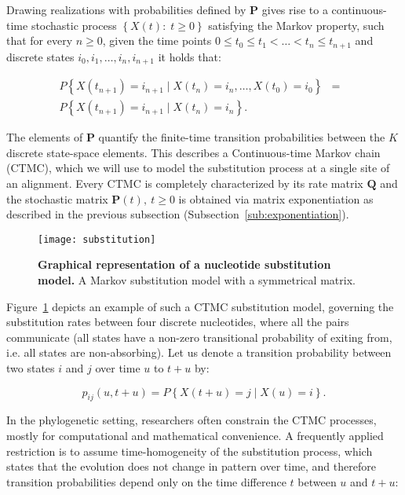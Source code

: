 Drawing realizations with probabilities defined by $\mathbf{P}$  gives rise to a continuous-time stochastic process $\left\{ X(t):\; t\geq0\right\}$ satisfying the Markov property, such that for every $n\geq 0$, given the time points $0\leq t_{0}\leq t_{1}<\ldots<t_{n}\leq t_{n+1}$ and discrete states $i_{0},i_{1}, \ldots, i_{n},i_{n+1}$ it holds that: 

\begin{eqnarray}
P\left\{ X(t_{n+1})=i_{n+1}\mid X(t_{n})=i_{n},\ldots, X(t_{0})=i_{0}\right\} & = & \\ \nonumber
P\left\{ X(t_{n+1})=i_{n+1}\mid X(t_{n})=i_{n}\right\} .
\label{eq:markov}
\end{eqnarray}

The elements of $\mathbf{P}$ quantify the finite-time transition probabilities between the $K$ discrete state-space elements.
This describes a Continuous-time Markov chain (CTMC), which  we will use to model the substitution process at a single site of an alignment.
Every CTMC is completely characterized by its rate matrix $\mathbf{Q}$ and the stochastic matrix $\mathbf{P}(t),\ t\geq0$ is obtained via matrix exponentiation as described in the previous subsection (Subsection~\ref{sub:exponentiation}).

\begin{figure}[H]
\centering
\texttt{[image: substitution]} 
\caption{
{ \footnotesize 
{\bf  Graphical representation of  a nucleotide substitution model.} A Markov substitution model with a symmetrical matrix.
} %
}
\label{fig:substitution}
\end{figure}

Figure~\ref{fig:substitution} depicts an example of such a CTMC substitution model, governing the substitution rates between four discrete nucleotides, where all the pairs communicate (all states have a non-zero transitional probability of exiting from, i.e. all states are non-absorbing).
Let us denote a transition probability between two states $i$ and $j$ over time $u$ to $t+u$ by:

\begin{equation}
p_{ij}\left(u,t+u\right)=P\left\{ X(t+u)=j\mid X(u)=i\right\} .
\end{equation}

In the phylogenetic setting, researchers often constrain the CTMC processes, mostly for computational and mathematical convenience.
A frequently applied restriction is to assume time-homogeneity of the substitution process, which states that the evolution does not change in pattern over time, and therefore transition probabilities depend only on the time difference $t$ between $u$ and $t + u$:

